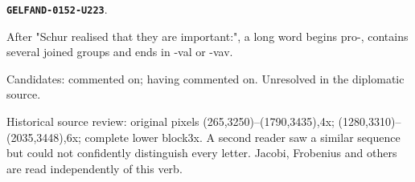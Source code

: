 \documentclass[11pt]{article}
\theoremstyle{definition}
\theoremstyle{remark}
\begin{document}
\par\noindent\leavevmode{}\label{GELFAND-0152-U223}\label{GELFAND-P001400:last-line-verb:note}\textbf{\texttt{GELFAND-0152-U223}}.\nopagebreak[4]\par
After "Schur realised that they are important:", a long word begins pro-, contains several joined groups and ends in -val or -vav.\par
Candidates: commented on; having commented on. Unresolved in the diplomatic source.\par
Historical source review: original pixels (265,3250)–(1790,3435),4x; (1280,3310)–(2035,3448),6x; complete lower block3x. A second reader saw a similar sequence but could not confidently distinguish every letter. Jacobi, Frobenius and others are read independently of this verb.\par\medskip
\end{document}
